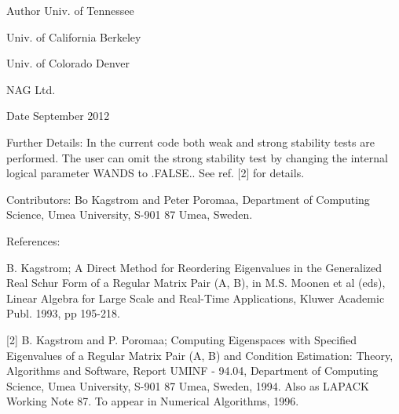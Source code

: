 \begin{DoxyAuthor}{Author}
Univ. of Tennessee 

Univ. of California Berkeley 

Univ. of Colorado Denver 

N\+A\+G Ltd. 
\end{DoxyAuthor}
\begin{DoxyDate}{Date}
September 2012 
\end{DoxyDate}
\begin{DoxyParagraph}{Further Details\+: }
In the current code both weak and strong stability tests are performed. The user can omit the strong stability test by changing the internal logical parameter W\+A\+N\+D\+S to .F\+A\+L\+S\+E.. See ref. \mbox{[}2\mbox{]} for details. 
\end{DoxyParagraph}
\begin{DoxyParagraph}{Contributors\+: }
Bo Kagstrom and Peter Poromaa, Department of Computing Science, Umea University, S-\/901 87 Umea, Sweden. 
\end{DoxyParagraph}
\begin{DoxyParagraph}{References\+: }
\begin{DoxyVerb}  [1] B. Kagstrom; A Direct Method for Reordering Eigenvalues in the
      Generalized Real Schur Form of a Regular Matrix Pair (A, B), in
      M.S. Moonen et al (eds), Linear Algebra for Large Scale and
      Real-Time Applications, Kluwer Academic Publ. 1993, pp 195-218.

  [2] B. Kagstrom and P. Poromaa; Computing Eigenspaces with Specified
      Eigenvalues of a Regular Matrix Pair (A, B) and Condition
      Estimation: Theory, Algorithms and Software,
      Report UMINF - 94.04, Department of Computing Science, Umea
      University, S-901 87 Umea, Sweden, 1994. Also as LAPACK Working
      Note 87. To appear in Numerical Algorithms, 1996.\end{DoxyVerb}
 
\end{DoxyParagraph}
